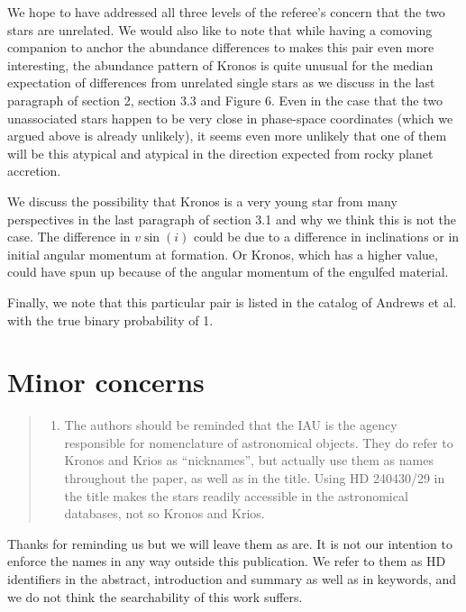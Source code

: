 \documentclass[12pt]{article}
\begin{document}
We hope to have addressed all three levels of the referee's concern that the two
stars are unrelated.
We would also like to note that while having a comoving companion to anchor the
abundance differences to makes this pair even more interesting, the abundance
pattern of Kronos is quite unusual for the median expectation of differences
from unrelated single stars as we discuss in the last paragraph of section 2,
section 3.3 and Figure 6. Even in the case that the two unassociated stars
happen to be very close in phase-space coordinates (which we argued above is
already unlikely), it seems even more unlikely that one of them will be
this atypical and atypical in the direction expected from rocky planet accretion.

We discuss the possibility that Kronos is a very young star from many
perspectives in the last paragraph of section 3.1 and why we think this is not
the case.
The difference in $v\sin(i)$ could be due to a difference in inclinations or 
in initial angular momentum at formation. Or Kronos, which has a higher value,
could have spun up because of the angular momentum of the engulfed material.

Finally, we note that this particular pair is listed in the catalog of Andrews et al.
with the true binary probability of 1.

\section*{Minor concerns}\label{minor-concerns}

\begin{quote}
\begin{enumerate}
\def\labelenumi{\arabic{enumi}.}
\itemsep1pt\parskip0pt
\item
  The authors should be reminded that the IAU is the agency responsible
  for nomenclature of astronomical objects. They do refer to Kronos and
  Krios as ``nicknames'', but actually use them as names throughout the
  paper, as well as in the title. Using HD 240430/29 in the title makes
  the stars readily accessible in the astronomical databases, not so
  Kronos and Krios.
\end{enumerate}
\end{quote}
Thanks for reminding us but we will leave them as are. It is not our intention
to enforce the names in any way outside this publication. We refer to them as HD
identifiers in the abstract, introduction and summary as well as in keywords,
and we do not think the searchability of this work suffers.
\end{document}
